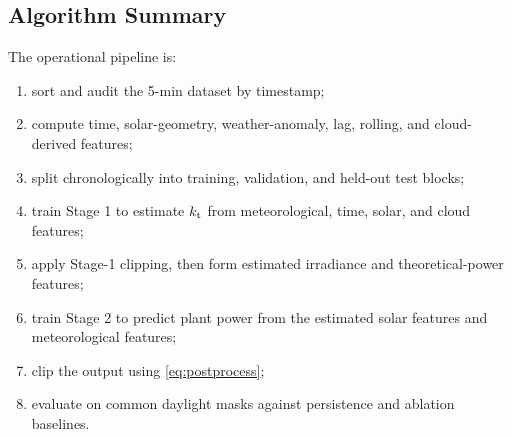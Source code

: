 \subsection{Algorithm Summary}

The operational pipeline is:
\begin{enumerate}
\item sort and audit the 5-min dataset by timestamp;
\item compute time, solar-geometry, weather-anomaly, lag, rolling, and cloud-derived features;
\item split chronologically into training, validation, and held-out test blocks;
\item train Stage 1 to estimate $k_{\mathrm{t}}$ from meteorological, time, solar, and cloud features;
\item apply Stage-1 clipping, then form estimated irradiance and theoretical-power features;
\item train Stage 2 to predict plant power from the estimated solar features and meteorological features;
\item clip the output using \eqref{eq:postprocess};
\item evaluate on common daylight masks against persistence and ablation baselines.
\end{enumerate}
